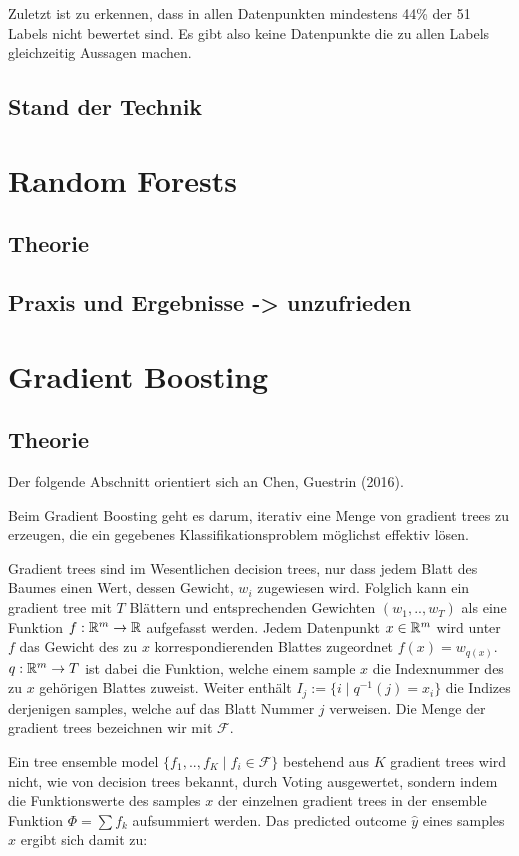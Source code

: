 \documentclass[a4paper,12pt]{scrartcl}
\begin{document}
Zuletzt ist zu erkennen, dass in allen Datenpunkten mindestens 44\% der 51 Labels nicht bewertet sind. Es gibt also keine Datenpunkte die zu allen Labels gleichzeitig Aussagen machen.


\subsection{Stand der Technik}


\section{Random Forests}

\subsection{Theorie}
\subsection{Praxis und Ergebnisse -> unzufrieden}

\section{Gradient Boosting}
\subsection{Theorie}

Der folgende Abschnitt orientiert sich an Chen, Guestrin (2016).

Beim Gradient Boosting geht es darum, iterativ eine Menge von gradient trees zu erzeugen, die ein gegebenes Klassifikationsproblem möglichst effektiv lösen.

Gradient trees sind im Wesentlichen decision trees, nur dass jedem Blatt des Baumes einen Wert, dessen Gewicht, $w_i$ zugewiesen wird. Folglich kann ein gradient tree mit $T$ Blättern und entsprechenden Gewichten $(w_1, .. ,w_T)$ als eine Funktion $f: \mathbb{R}^m \to \mathbb{R}$ aufgefasst werden. Jedem Datenpunkt $x \in \mathbb{R}^m$ wird unter $f$ das Gewicht des zu $x$ korrespondierenden Blattes zugeordnet $f(x) = w_{q(x)}$. $q: \mathbb{R}^m \to T$ ist dabei die Funktion, welche einem sample $x$ die Indexnummer des zu $x$ gehörigen Blattes zuweist. Weiter enthält $I_j := \{ i \mid q^{-1}(j)=x_i \}$ die Indizes derjenigen samples, welche auf das Blatt Nummer $j$ verweisen. Die Menge der gradient trees bezeichnen wir mit $\mathcal{F}$.

 Ein tree ensemble model $\{f_1, .. ,f_K \mid f_i \in \mathcal{F}\}$ bestehend aus $K$ gradient trees wird nicht, wie von decision trees bekannt, durch Voting ausgewertet, sondern indem die Funktionswerte des samples $x$ der einzelnen gradient trees in der ensemble Funktion $\Phi = \sum f_k$ aufsummiert werden. Das predicted outcome $\hat{y}$ eines samples $x$ ergibt sich damit zu:
 
\end{document}
